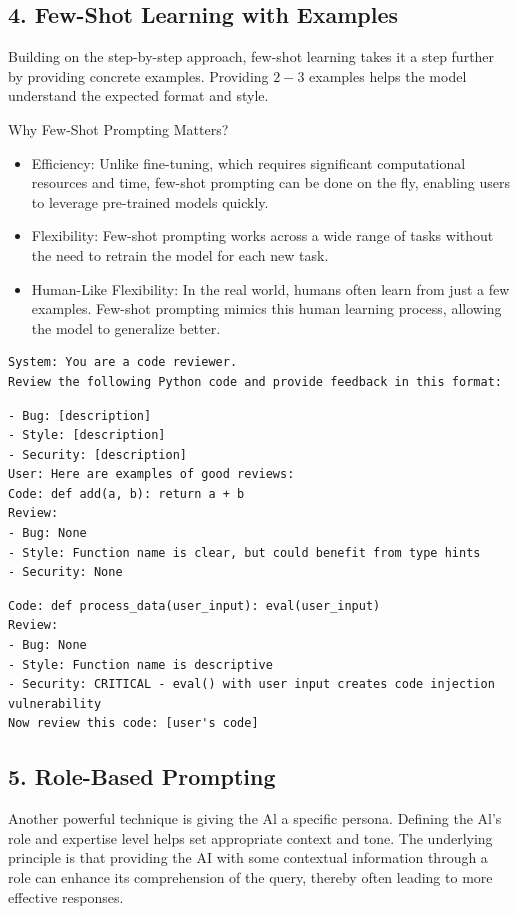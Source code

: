 \documentclass[10pt]{article}
\begin{document}
\subsection*{4. Few-Shot Learning with Examples}
Building on the step-by-step approach, few-shot learning takes it a step further by providing concrete examples. Providing $2-3$ examples helps the model understand the expected format and style.

Why Few-Shot Prompting Matters?

\begin{itemize}
  \item Efficiency: Unlike fine-tuning, which requires significant computational resources and time, few-shot prompting can be done on the fly, enabling users to leverage pre-trained models quickly.
  \item Flexibility: Few-shot prompting works across a wide range of tasks without the need to retrain the model for each new task.
  \item Human-Like Flexibility: In the real world, humans often learn from just a few examples. Few-shot prompting mimics this human learning process, allowing the model to generalize better.
\end{itemize}

\begin{example}
	\begin{verbatim}
System: You are a code reviewer.
Review the following Python code and provide feedback in this format:
	\end{verbatim}
	
	\begin{verbatim}
- Bug: [description]
- Style: [description]
- Security: [description]
User: Here are examples of good reviews:
Code: def add(a, b): return a + b
Review:
- Bug: None
- Style: Function name is clear, but could benefit from type hints
- Security: None
	\end{verbatim}
	
	\begin{verbatim}
Code: def process_data(user_input): eval(user_input)
Review:
- Bug: None
- Style: Function name is descriptive
- Security: CRITICAL - eval() with user input creates code injection
vulnerability
Now review this code: [user's code]
	\end{verbatim}
\end{example}
\subsection*{5. Role-Based Prompting}
Another powerful technique is giving the Al a specific persona. Defining the Al's role and expertise level helps set appropriate context and tone. The underlying\\
principle is that providing the AI with some contextual information through a role can enhance its comprehension of the query, thereby often leading to more effective responses.
\end{document}
